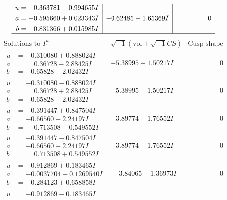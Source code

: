 \documentclass[1p]{elsarticle_modified}
\theoremstyle{definition}
\newcommand{\I}{\sqrt{-1}}
\begin{document}
$$\begin{array}{c|c|c}
\begin{aligned}
u &= \phantom{-}0.363781 - 0.994655 I \\
a &= -0.595660 + 0.023343 I \\
b &= \phantom{-}0.831366 + 0.015985 I\end{aligned}
 & -0.62485 + 1.65369 I & \phantom{-0.000000 } 0\\
 \hline 
 \end{array}$$\newpage$$\begin{array}{c|c|c}  
\text{Solutions to }I^u_{1}& \I (\text{vol} + \sqrt{-1}CS) & \text{Cusp shape}\\
 \hline 
\begin{aligned}
u &= -0.310080 + 0.888024 I \\
a &= \phantom{-}0.36728 - 2.88425 I \\
b &= -0.65828 + 2.02432 I\end{aligned}
 & -5.38995 - 1.50217 I & \phantom{-0.000000 } 0 \\ \hline\begin{aligned}
u &= -0.310080 - 0.888024 I \\
a &= \phantom{-}0.36728 + 2.88425 I \\
b &= -0.65828 - 2.02432 I\end{aligned}
 & -5.38995 + 1.50217 I & \phantom{-0.000000 } 0 \\ \hline\begin{aligned}
u &= -0.391447 + 0.847504 I \\
a &= -0.66560 + 2.24197 I \\
b &= \phantom{-}0.713508 - 0.549552 I\end{aligned}
 & -3.89774 + 1.76552 I & \phantom{-0.000000 } 0 \\ \hline\begin{aligned}
u &= -0.391447 - 0.847504 I \\
a &= -0.66560 - 2.24197 I \\
b &= \phantom{-}0.713508 + 0.549552 I\end{aligned}
 & -3.89774 - 1.76552 I & \phantom{-0.000000 } 0 \\ \hline\begin{aligned}
u &= -0.912869 + 0.183465 I \\
a &= -0.0037704 + 0.1269540 I \\
b &= -0.284123 + 0.658858 I\end{aligned}
 & \phantom{-}3.84065 - 1.36973 I & \phantom{-0.000000 } 0 \\ \hline\begin{aligned}
u &= -0.912869 - 0.183465 I \\

\end{aligned}
\end{array}$$
\end{document}

